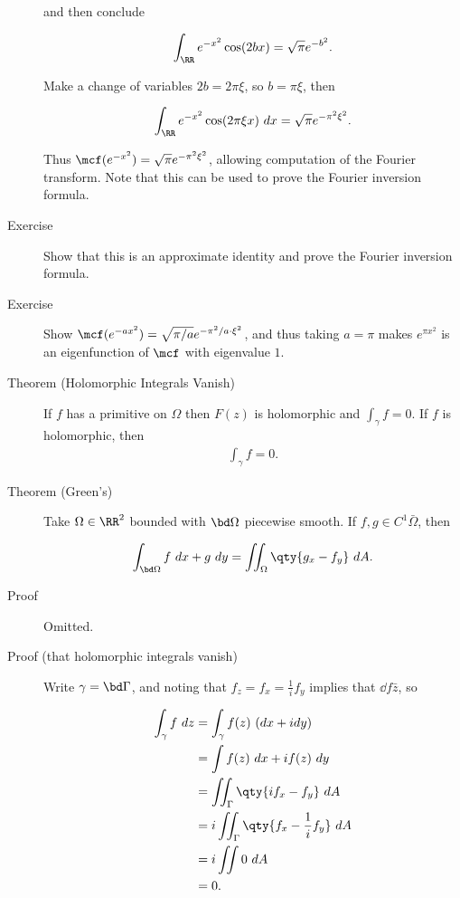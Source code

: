 \begin{description}
and then conclude

\begin{align*}
\int_\RR e^{-x^2} \cos(2bx) = \sqrt{\pi} e^{-b^2}
.\end{align*}

Make a change of variables \(2b = 2\pi \xi\), so \(b = \pi \xi\), then

\begin{align*}
\int_\RR e^{-x^2} \cos(2\pi \xi x) ~dx = \sqrt{\pi} e^{-\pi^2 \xi^2}
.\end{align*}

Thus \(\mcf(e^{-x^2}) = \sqrt{\pi} e^{-\pi^2 \xi^2}\), allowing
computation of the Fourier transform. Note that this can be used to
prove the Fourier inversion formula.
\item[Exercise]
Show that this is an approximate identity and prove the Fourier
inversion formula.
\item[Exercise]
Show \(\mcf(e^{-ax^2}) = \sqrt{\pi/a} e^{-\pi^2/a \cdot \xi^2}\), and
thus taking \(a = \pi\) makes \(e^{\pi x^2}\) is an eigenfunction of
\(\mcf\) with eigenvalue \(1\).
\item[Theorem (Holomorphic Integrals Vanish)]
If \(f\) has a primitive on \(\Omega\) then \(F(z)\) is holomorphic and
\(\int_\gamma f = 0\). If \(f\) is holomorphic, then
\begin{align*}\int_\gamma f = 0.\end{align*}
\item[Theorem (Green's)]
Take \(\Omega \in \RR^2\) bounded with \(\bd \Omega\) piecewise smooth.
If \(f, g\in C^1{\bar \Omega}\), then

\begin{align*}
\int_{\bd \Omega} f ~dx + g ~dy = \iint_{\Omega} \qty{g_x - f_y} ~dA
.\end{align*}
\item[Proof]
Omitted.
\item[Proof (that holomorphic integrals vanish)]
Write \(\gamma = \bd \Gamma\), and noting that
\(f_z = f_x = \frac 1 i f_y\) implies that \(\dd{f}{\bar z}\), so

\begin{align*}
\int_\gamma f ~dz 
&= \int_\gamma f(z) ~(dx + i dy) \\
&= \int f(z) ~dx + i f(z) ~dy \\
&= \iint_\Gamma \qty{if_x - f_y} ~dA \\
&= i \iint_\Gamma \qty{f_x - \frac 1 i f_y} ~dA \\
&= i \iint 0 ~dA \\
&= 0
.\end{align*}
\end{description}

